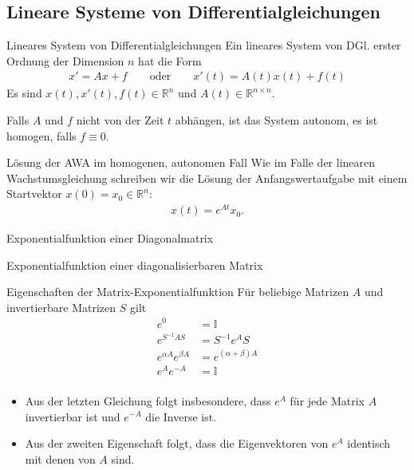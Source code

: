 \documentclass[notheorems,hidelinks,aspectratio=1610]{beamer}
\def\R{\mathbb R}
\def\Rnn{\R^{n\times n}}
\begin{document}
\subsection{Lineare Systeme von Differentialgleichungen}
\frame{\subtoc}

\begin{frame}
  \begin{block}{Lineares System von Differentialgleichungen}
    Ein lineares System von DGl. erster Ordnung der Dimension $n$ hat
    die Form
    \begin{gather*}
      x' = Ax + f
      \qquad\text{oder}\qquad
      x'(t) = A(t)x(t) + f(t)
    \end{gather*}
    Es sind $x(t), x'(t), f(t) \in \R^n$ und $A(t)\in \Rnn$.
    
    Falls $A$ und $f$ nicht von der Zeit $t$ abhängen, ist das System
    autonom, es ist homogen, falls $f\equiv0$.
  \end{block}

  \begin{block}{Lösung der AWA im homogenen, autonomen Fall}
    Wie im Falle der linearen Wachstumsgleichung schreiben wir die
    Lösung der Anfangswertaufgabe mit einem Startvektor $x(0) = x_0\in\R^n$:
    \begin{gather*}
      x(t) = e^{At} x_0.
    \end{gather*}
  \end{block}
\end{frame}

\begin{frame}{Exponentialfunktion einer Diagonalmatrix}
\end{frame}

\begin{frame}{Exponentialfunktion einer diagonalisierbaren Matrix}
  
\end{frame}

\begin{frame}{Eigenschaften der Matrix-Exponentialfunktion}
  Für beliebige Matrizen $A$ und invertierbare Matrizen $S$ gilt
  \begin{align*}
    e^0 &= \mathbb I\\
    e^{S^{-1}AS} &= S^{-1} e^A S\\
    e^{\alpha A} e^{\beta A} &= e^{(\alpha+\beta) A}\\
    e^{A}e^{-A} &= \mathbb I\\
  \end{align*}
  \begin{itemize}
  \item Aus der letzten Gleichung folgt insbesondere, dass $e^A$ für jede
    Matrix $A$ invertierbar ist und $e^{-A}$ die Inverse ist.
  \item Aus der zweiten Eigenschaft folgt, dass die Eigenvektoren von
    $e^A$ identisch mit denen von $A$ sind.
  \end{itemize}
\end{frame}
\end{document}
